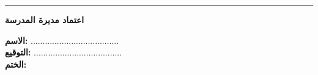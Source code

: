 \documentclass[12pt, a4paper]{extarticle}
\begin{document}
\vspace{0.6cm}
\noindent\rule{\textwidth}{0.4pt}
\vspace{0.3cm}

\begin{center}
    \textbf{اعتماد مديرة المدرسة}
\end{center}
\vspace{0.2cm}
\noindent
\textbf{الاسم:} .....................................\\[0.2cm]
\textbf{التوقيع:} .....................................\\[0.2cm]
\textbf{الختم:}
\end{document}
